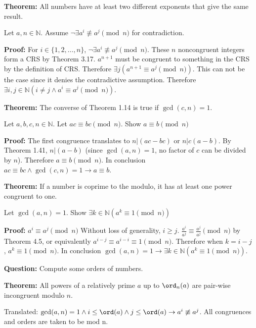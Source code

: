 \item \textbf{Theorem:} All numbers have at least two different exponents that give the same result.

Let \(a, n \in \mathbb N\). Assume \(\neg \exists a^i \not\equiv a^j \pmod n\) for contradiction.

\textbf{Proof:} For \(i \in \{1, 2, \dots, n\}\), \(\neg \exists a^i \not\equiv a^j \pmod n\). These \(n\) noncongruent integers form a CRS by Theorem 3.17. \(a^{n+1}\) must be congruent to something in the CRS by the definition of CRS. Therefore \(\exists j (a^{n+1} \equiv a^j \pmod n)\). This can not be the case since it denies the contradictive assumption. Therefore \(\exists i, j \in \mathbb N (i \neq j \wedge a^i \equiv a^j \pmod n)\). \qedhere

\item \textbf{Theorem:} The converse of Theorem 1.14 is true if \(\gcd(c, n) = 1\).

Let \(a, b, c, n \in \mathbb N\). Let \(ac \equiv bc \pmod n\). Show \(a \equiv b \pmod n\)

\textbf{Proof:} The first congruence translates to \(n | (ac-bc)\) or \(n | c(a-b)\). By Theorem 1.41, \(n | (a-b)\) (since \(\gcd(a, n) = 1\), no factor of \(c\) can be divided by \(n\)). Therefore \(a \equiv b \pmod n\). In conclusion \(ac \equiv bc \wedge \gcd(c, n) = 1 \rightarrow a \equiv b\). \qedhere

\item \textbf{Theorem:} If a number is coprime to the modulo, it has at least one power congruent to one.

Let \(\gcd(a, n) = 1\). Show \(\exists k \in \mathbb N (a^k \equiv 1 \pmod n)\)

\textbf{Proof:} \(a^i \equiv a^j \pmod n\) Without loss of generality, \(i \geq j\). \(\frac{a^i}{a^j} \equiv \frac{a^j}{a^j} \pmod n\) by Theorem 4.5, or equivalently \(a^{i-j} \equiv a^{i-i} \equiv 1 \pmod n\). Therefore when \(k = i - j\), \(a^k \equiv 1 \pmod n\). In conclusion \(\gcd(a, n) = 1 \rightarrow \exists k \in \mathbb N (a^k \equiv 1 \pmod n)\). \qedhere

\item \textbf{Question:} Compute some orders of numbers. %

\item \textbf{Theorem:} All powers of a relatively prime \(a\) up to \(\ord_n(a)\) are pair-wise incongruent modulo \(n\).

Translated: \(\gcd(a, n) = 1 \wedge i \leq \ord(a) \wedge j \leq \ord(a) \rightarrow a^i \not\equiv a^j\). All congruences and orders are taken to be mod n.

